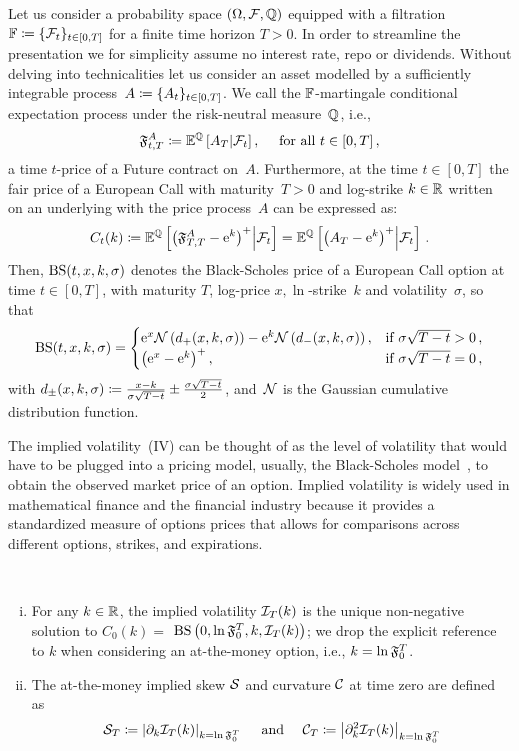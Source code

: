 Let us consider a probability space $(\Omega,\mathcal{F}, \mathbb{Q})$ equipped with a filtration $\mathbb{F}\coloneqq\{\mathcal{F}_t\}_{t\in[0,T]}$ for a finite time horizon $T>0$. In order to streamline the presentation we for simplicity assume no interest rate, repo or dividends. Without delving into technicalities let us consider an asset modelled by a sufficiently integrable process~$A\coloneqq \{A_t\}_{t\in[0, T]}$. We call the $\mathbb{F}$-martingale conditional expectation process under the risk-neutral measure~$\mathbb{Q}$, i.e.,
\[
\mathfrak{F}_{t,T}^A\coloneqq\mathbb{E}^{\mathbb{Q}}\left[A_T\middle\vert\mathcal{F}_t\right], \quad \text { for all } t \in [0,T]\,,
\]
a time $t$-price of a Future contract on~$A$. Furthermore, at the time $t\in[0, T]$ the fair price of a European Call with maturity~$T>0$ and log-strike $k\in \mathbb{R}$ written on an underlying with the price process~$A$ can be expressed as:
\[
C_t(k) \coloneqq \mathbb{E}^{\mathbb{Q}}\left[\left(\mathfrak{F}_{T,T}^A - \mathrm{e}^k\right)^+\middle\vert\mathcal{F}_t\right] = \mathbb{E}^{\mathbb{Q}}\left[\left(A_T - \mathrm{e}^k\right)^+\middle\vert\mathcal{F}_t\right]\,.
\]
Then, $\mathrm{BS}(t, x, k, \sigma)$ denotes the Black-Scholes price of a European Call option at time $t \in [0, T]$, with maturity $T$, log-price $x, \ln$-strike~$k$ and volatility~$\sigma$, so that
$$
\mathrm{BS}(t, x, k, \sigma)= \begin{cases}\mathrm{e}^x \mathcal{N}\left(d_{+}(x, k, \sigma)\right)-\mathrm{e}^k \mathcal{N}\left(d_{-}(x, k, \sigma)\right), & \text {if } \sigma \sqrt{T-t}>0\,, \\ \left(\mathrm{e}^x-\mathrm{e}^k\right)^{+}, & \text {if } \sigma \sqrt{T-t}=0\,,\end{cases}
$$
with $d_{\pm}(x, k, \sigma)\coloneqq\frac{x-k}{\sigma \sqrt{T-t}} \pm \frac{\sigma \sqrt{T-t}}{2}$, and~$\mathcal{N}$ is the Gaussian cumulative distribution function. 

The implied volatility~(IV) can be thought of as the level of volatility that would have to be plugged into a pricing model, usually, the Black-Scholes model~\cite{Black1973TheLiabilities}, to obtain the observed market price of an option. Implied volatility is widely used in mathematical finance and the financial industry because it provides a standardized measure of options prices that allows for comparisons across different options, strikes, and expirations.
\begin{definition}\label{def:impliedvol}\
\begin{enumerate}[i.]
    \item For any $k \in \mathbb{R}$, the implied volatility $\mathcal{I}_T(k)$ is the unique non-negative solution to $C_0(k)=$ $\mathrm{BS}\left(0, \ln\mathfrak{F}_0^T, k, \mathcal{I}_T(k)\right)$; we drop the explicit reference to $k$ when considering an at-the-money option, i.e., $k=\ln\mathfrak{F}_0^T$.
    \item The at-the-money implied skew $\mathcal{S}$ and curvature $\mathcal{C}$ at time zero are defined as
    $$
    \mathcal{S}_T\coloneqq\left|\partial_k \mathcal{I}_T(k)\right|_{k=\ln\mathfrak{F}_0^T} \quad \text { and } \quad \mathcal{C}_T\coloneqq\left|\partial_k^2 \mathcal{I}_T(k)\right|_{k=\ln\mathfrak{F}_0^T}
    $$
\end{enumerate}
\end{definition}

